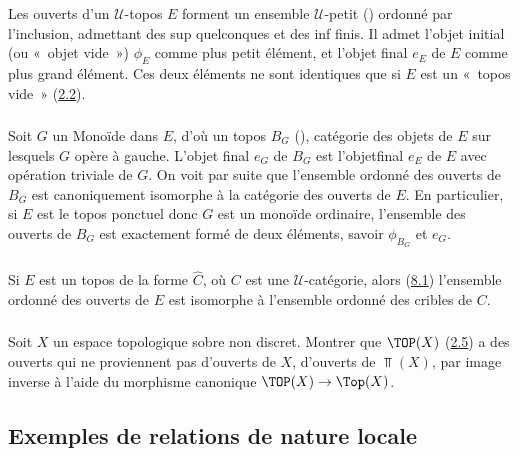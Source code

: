 \subsubsection{}
Les ouverts d'un $𝒰$-topos $E$ forment un ensemble
$𝒰$-petit () ordonné par l'inclusion,
admettant des sup quelconques et des inf finis. Il admet l'objet
initial (ou « objet vide ») $\phi_E$ comme plus petit élément,
et l'objet final $e_E$ de $E$ comme plus grand élément. Ces deux
éléments ne sont identiques que si $E$ est un « topos vide »
(\hyperref[IV.subsec2.2]{2.2}).

\subsubsection{}
Soit $G$ un Monoïde dans $E$, d'où un topos $B_G$
(), catégorie des objets de $E$ sur lesquels $G$
opère à gauche. L'objet final $e_G$ de $B_G$ est
l'objet\pageoriginale final $e_E$ de $E$ avec opération triviale de
$G$. On voit par suite que l'ensemble ordonné des ouverts de $B_G$
est canoniquement isomorphe à la catégorie des ouverts de $E$. En
particulier, si $E$ est le topos ponctuel donc $G$ est un monoïde
ordinaire, l'ensemble des ouverts de $B_G$ est exactement formé de
deux éléments, savoir $\phi_{B_G}$ et $e_G$.

\subsubsection{}
Si $E$ est un topos de la forme $\widehat{C}$, où $C$ est une
$𝒰$-catégorie, alors (\hyperref[IV.subsec8.1]{8.1}) l'ensemble ordonné
des ouverts de $E$ est isomorphe à l'ensemble ordonné des cribles de
$C$.

\subsubsection{}
Soit $X$ un espace topologique sobre non discret. Montrer que
$\TOP(X)$ (\hyperref[IV.subsec2.5]{2.5}) a des ouverts qui ne proviennent pas
d'ouverts de $X$, \ie d'ouverts de $\Top(X)$, par image inverse à
l'aide du morphisme canonique  $\TOP(X)\rightarrow
\Top(X)$.

\subsection{Exemples de relations de nature locale}


